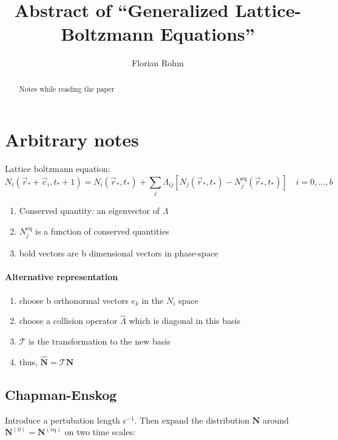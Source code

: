 \documentclass[]{article}
\title{Abstract of ``Generalized Lattice-Boltzmann Equations''}
\author{Florian Rohm}
\begin{document}
\maketitle

\begin{abstract}
Notes while reading the paper
\end{abstract}

\section{Arbitrary notes}

Lattice boltzmann equation:
\[
N_i (\vec{r}_{*} + \vec{c}_i, t_{*} + 1) = N_i (\vec{r}_{*}, t_{*}) + \sum_j \Lambda_{ij} [N_j(\vec{r}_{*}, t_{*}) - N_j^{\text{eq}} (\vec{r}_{*}, t_{*})] \quad i = 0, \dots, b
\]
\begin{enumerate}
  \item Conserved quantity: an eigenvector of $\Lambda$
  \item $N_j^{\text{eq}}$ is a function of conserved quantities
  \item bold vectors are b dimensional vectors in phase-space
\end{enumerate}

\paragraph{Alternative representation}
\label{par:Alternative representation}

\begin{enumerate}
  \item choose b orthonormal vectors $e_k$ in the $N_i$ space
  \item choose a collision operator $\hat{\Lambda}$ which is diagonal in this basis
  \item $\mathcal{T}$ is the transformation to the new basis
  \item thus, $\boldsymbol{\hat{N}} = \mathcal{T} \boldsymbol{N}$
\end{enumerate}

\subsection{Chapman-Enskog}
\label{sub:Chapman-Enskog}
Introduce a pertubation length $\epsilon^{-1}$.
Then expand the distribution $\boldsymbol{N}$ around $\boldsymbol{N}^{(0)} = \boldsymbol{N}^{(\text{eq})}$ on two time scales:
\end{document}
